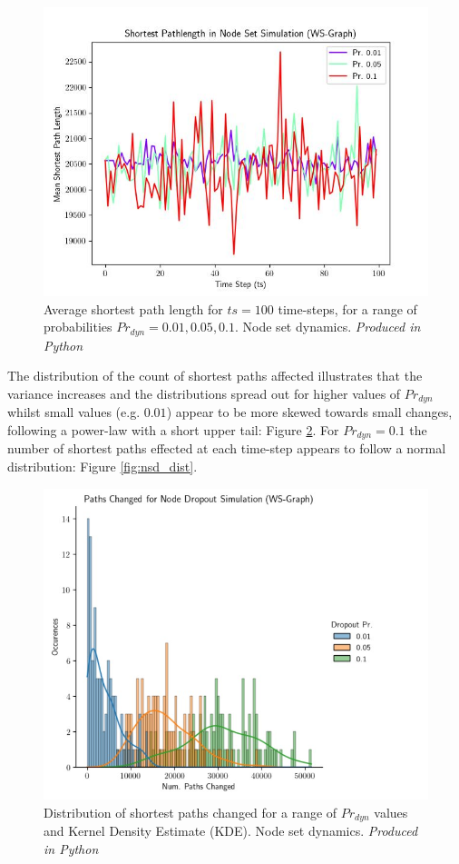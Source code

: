 \documentclass[
	a4paper, %
	10pt, %
	unnumberedsections, %
	twoside, %
]{LTJournalArticle}
\begin{document}
\begin{figure}[H]
	\includegraphics[width=\linewidth]{Figures/nsd/NS_ex3_avg_length.jpg}
	\caption{Average shortest path length for \(ts = 100\) time-steps, for a range of probabilities \(Pr_{dyn} = 0.01, 0.05, 0.1\). Node set dynamics. \emph{Produced in Python}}
	\label{fig:nsd_lengths}
\end{figure}

The distribution of the count of shortest paths affected illustrates that the variance increases and the distributions spread out for higher values of \(Pr_{dyn}\) whilst small values (e.g. \(0.01\)) appear to be more skewed towards small changes, following a power-law with a short upper tail: Figure \ref{fig:nsd_dist_prob}. For \(Pr_{dyn} = 0.1\) the number of shortest paths effected at each time-step appears to follow a normal distribution: Figure \ref{fig:nsd_dist}. 

\begin{figure}[H]
	\includegraphics[width=\linewidth]{Figures/nsd/paths_prob_dist.jpg}
	\caption{Distribution of shortest paths changed for a range of \(Pr_{dyn}\) values and Kernel Density Estimate (KDE). Node set dynamics. \emph{Produced in Python}}
	\label{fig:nsd_dist_prob}
\end{figure}
\end{document}
